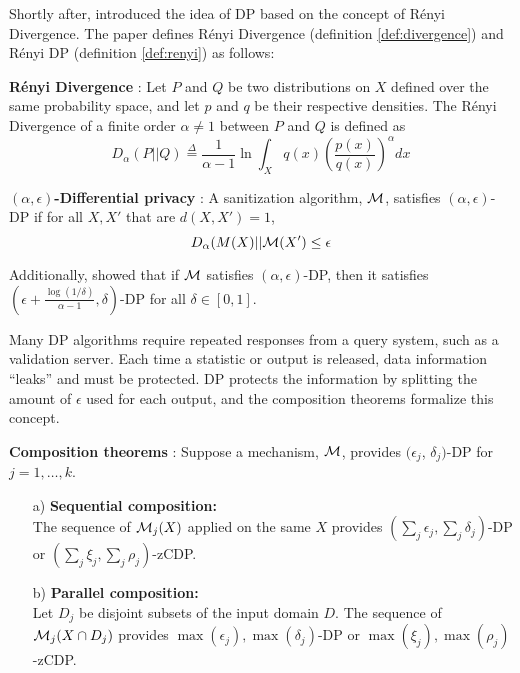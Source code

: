 Shortly after, \citet{mironov2017renyi} introduced the idea of DP based on the concept of R\'enyi Divergence. The paper defines R\'enyi Divergence (definition \ref{def:divergence}) and R\'enyi DP (definition \ref{def:renyi}) as follows:

\begin{defn}\label{def:divergence} \textbf{R\'enyi Divergence} \citep{renyi1961measures}: Let $P$ and $Q$ be two distributions on $X$ defined over the same probability space, and let $p$ and $q$ be their respective densities. The R\'enyi Divergence of a finite order $\alpha\neq1$ between $P$ and $Q$ is defined as
    \begin{equation}
        D_\alpha(P||Q)\stackrel{\Delta}{=}\frac{1}{\alpha-1}\ln\int_X q(x)\left(\frac{p(x)}{q(x)}\right)^\alpha dx
    \end{equation}
\end{defn}

\begin{defn}\label{def:renyi} \textbf{$(\alpha, \epsilon)$-Differential privacy} \citep{mironov2017renyi}: A sanitization algorithm, $\mathcal{M}$, satisfies $(\alpha, \epsilon)$-DP if for all $X, X'$ that are $d(X,X')=1$,
    \begin{equation}
        D_\alpha(M(X)||\mathcal{M}(X')\leq\epsilon
    \end{equation}
\end{defn}

Additionally, \citet{mironov2017renyi} showed that if $\mathcal{M}$ satisfies $(\alpha,\epsilon)$-DP, then it satisfies $\left(\epsilon + \frac{\log(1/\delta)}{\alpha-1}, \delta \right)$-DP for all $\delta\in[0,1]$.

Many DP algorithms require repeated responses from a query system, such as a validation server. Each time a statistic or output is released, data information ``leaks'' and must be protected. DP protects the information by splitting the amount of $\epsilon$ used for each output, and the composition theorems formalize this concept.

\begin{thm}\label{thm:comp} \textbf{Composition theorems} \citep{mcsherry2009privacy,dwork2016concentrated,bun2016concentrated}:
Suppose a mechanism, $\mathcal{M}$, provides $(\epsilon_j$, $\delta_j)$-DP for $j=1,\ldots,k$.
  \begin{itemize}\setlength{\itemindent}{15pt}
  \item[a)] \textbf{Sequential composition:}\\
    The sequence of $\mathcal{M}_j(X)$ applied on the same $X$ provides $(\sum_j\epsilon_j,\sum_j\delta_j)$-DP or $(\sum_j\xi_j,\sum_j\rho_j)$-zCDP.
  \item[b)] \textbf{Parallel composition:}\\
    Let  $D_j$ be disjoint subsets of the input domain $D$. The sequence of $\mathcal{M}_j(X\cap D_j)$ provides $\max(\epsilon_j), \max(\delta_j)$-DP or $\max(\xi_j), \max(\rho_j)$-zCDP.
  \end{itemize}
\end{thm}

